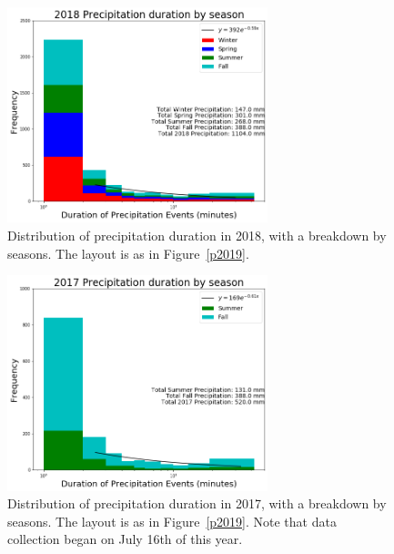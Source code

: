 \documentclass[11pt]{report}
\begin{document}
\clearpage
\begin{figure}[t]
  \centering
  \includegraphics[width=0.675\textwidth]{Figures/precip_2018.png}
  \caption[Precipitation histogram for 2018 broken down by season]{\label{p2018}
    Distribution of precipitation duration in 2018, with a breakdown
    by seasons. The layout is as in Figure~\ref{p2019}.}
\end{figure}

\begin{figure}[b]
	\centering
	\includegraphics[width=0.675\textwidth]{Figures/precip_2017.png}
	\caption[Precipitation histogram for 2017 broken down by
          season]{\label{p2017} Distribution of precipitation duration
          in 2017, with a breakdown by seasons. The layout is as in
          Figure~\ref{p2019}. Note that data collection began on July 16th
          of this year.}
\end{figure}


\clearpage
\end{document}
